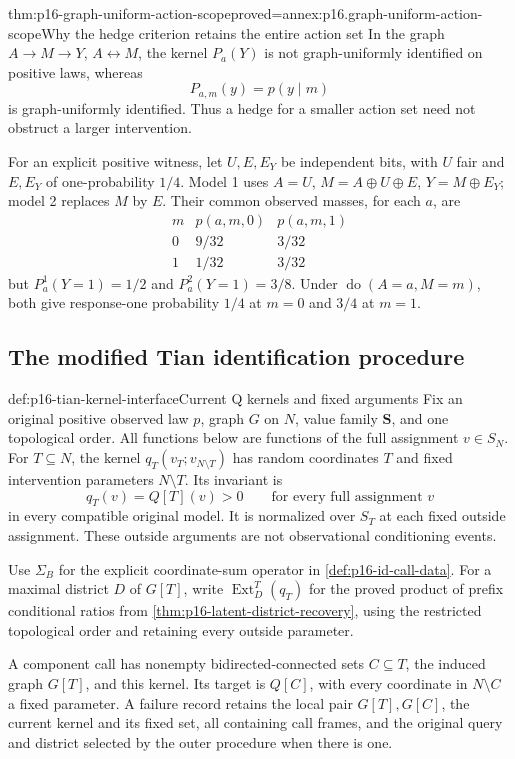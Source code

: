 \begin{hbtheorem}{thm:p16-graph-uniform-action-scope}{proved=annex:p16.graph-uniform-action-scope}{Why the hedge criterion retains the entire action set}
In the graph \(A\to M\to Y\), \(A\leftrightarrow M\),
the kernel \(P_a(Y)\) is not graph-uniformly identified on
positive laws, whereas
\[
 P_{a,m}(y)=p(y\mid m)
\]
is graph-uniformly identified. Thus a hedge for a smaller action
set need not obstruct a larger intervention.

For an explicit positive witness, let \(U,E,E_Y\) be independent
bits, with \(U\) fair and \(E,E_Y\) of one-probability \(1/4\).
Model 1 uses \(A=U\), \(M=A\oplus U\oplus E\),
\(Y=M\oplus E_Y\); model 2 replaces \(M\) by \(E\).
Their common observed masses, for each \(a\), are
\[
\begin{array}{c|cc}
m&p(a,m,0)&p(a,m,1)\\\hline
0&9/32&3/32\\
1&1/32&3/32
\end{array}
\]
but \(P^1_a(Y=1)=1/2\) and \(P^2_a(Y=1)=3/8\).
Under \(\operatorname{do}(A=a,M=m)\), both give response-one
probability \(1/4\) at \(m=0\) and \(3/4\) at \(m=1\).
\end{hbtheorem}

\subsection{The modified Tian identification procedure}

\begin{hbdefinition}{def:p16-tian-kernel-interface}{Current Q kernels and fixed arguments}
Fix an original positive observed law \(p\), graph \(G\) on
\(N\), value family \(\mathbf S\), and one topological order.
All functions below are functions of the full assignment \(v\in S_N\).
For \(T\subseteq N\), the kernel \(q_T(v_T;v_{N\setminus T})\)
has random coordinates \(T\) and fixed intervention parameters
\(N\setminus T\). Its invariant is
\[
 q_T(v)=Q[T](v)>0\qquad\text{for every full assignment }v
\]
in every compatible original model. It is normalized over \(S_T\)
at each fixed outside assignment. These outside arguments are not
observational conditioning events.

Use \(\Sigma_B\) for the explicit coordinate-sum operator in
\cref{def:p16-id-call-data}. For a maximal district \(D\) of
\(G[T]\), write \(\operatorname{Ext}^T_D(q_T)\) for the
proved product of prefix conditional ratios from
\cref{thm:p16-latent-district-recovery}, using the restricted
topological order and retaining every outside parameter.

A component call has nonempty bidirected-connected sets
\(C\subseteq T\), the induced graph \(G[T]\), and this
kernel. Its target is \(Q[C]\), with every coordinate in
\(N\setminus C\) a fixed parameter. A failure record retains
the local pair \(G[T],G[C]\), the current kernel and its fixed
set, all containing call frames, and the original query and district
selected by the outer procedure when there is one.
\end{hbdefinition}


